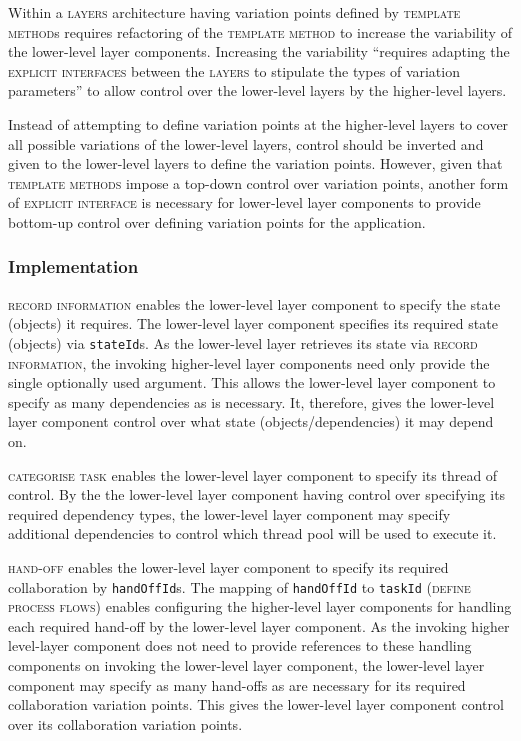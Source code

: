 \documentclass[prodmode]{style/acmlarge}
\begin{document}
Within a \textsc{layers} architecture having variation points defined by
\textsc{template method}s requires refactoring of the \textsc{template method}
to increase the variability of the lower-level layer components.  Increasing the
variability ``requires adapting the \textsc{explicit interfaces} between the
\textsc{layers} to stipulate the types of variation parameters'' \cite[p.
5]{ioc} to allow control over the lower-level layers by the higher-level layers.

Instead of attempting to define variation points at the higher-level layers to
cover all possible variations of the lower-level layers, control should be
inverted and given to the lower-level layers to define the variation points. 
However, given that \textsc{template methods} impose a top-down control over
variation points, another form of \textsc{explicit interface} is necessary for
lower-level layer components to provide bottom-up control over defining
variation points for the application.



\subsubsection*{Implementation}

\textsc{record information} enables the lower-level layer component to specify
the state (objects) it requires.  The lower-level layer component specifies its
required state (objects) via \texttt{stateId}s.  As the lower-level layer
retrieves its state via \textsc{record information}, the invoking higher-level
layer components need only provide the single optionally used argument.  This
allows the lower-level layer component to specify as many dependencies as is
necessary.  It, therefore, gives the lower-level layer component control over
what state (objects/dependencies) it may depend on.

\textsc{categorise task} enables the lower-level layer component to specify its
thread of control.  By the the lower-level layer component having control over
specifying its required dependency types, the lower-level layer component may
specify additional dependencies to control which thread pool will be used to
execute it.

\textsc{hand-off} enables the lower-level layer component to specify its
required collaboration by \texttt{handOffId}s.  The mapping of
\texttt{handOffId} to \texttt{taskId} (\textsc{define process flows}) enables
configuring the higher-level layer components for handling each required
hand-off by the lower-level layer component.  As the invoking higher level-layer
component does not need to provide references to these handling components on
invoking the lower-level layer component, the lower-level layer component may
specify as many hand-offs as are necessary for its required collaboration
variation points.  This gives the lower-level layer component control over its
collaboration variation points.
\end{document}
